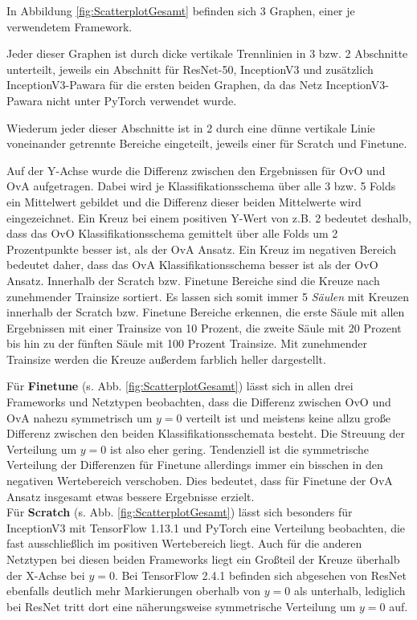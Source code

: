 In Abbildung \ref{fig:ScatterplotGesamt} befinden sich 3 Graphen, einer je verwendetem Framework.

Jeder dieser Graphen ist durch dicke vertikale Trennlinien in 3 bzw. 2 Abschnitte unterteilt, jeweils ein Abschnitt für ResNet-50, InceptionV3 und zusätzlich InceptionV3-Pawara für die ersten beiden Graphen, da das Netz InceptionV3-Pawara nicht unter PyTorch \cite{pytorch} verwendet wurde.

Wiederum jeder dieser Abschnitte ist in 2 durch eine dünne vertikale Linie voneinander getrennte Bereiche eingeteilt, jeweils einer für Scratch und Finetune.

Auf der Y-Achse wurde die Differenz zwischen den Ergebnissen für OvO und OvA aufgetragen. Dabei wird je Klassifikationsschema über alle 3 bzw. 5 Folds ein Mittelwert gebildet und die Differenz dieser beiden Mittelwerte wird eingezeichnet. Ein Kreuz bei einem positiven Y-Wert von z.B. 2 bedeutet deshalb, dass das OvO Klassifikationsschema gemittelt über alle Folds um 2 Prozentpunkte besser ist, als der OvA Ansatz. Ein Kreuz im negativen Bereich bedeutet daher, dass das OvA Klassifikationsschema besser ist als der OvO Ansatz.
Innerhalb der Scratch bzw. Finetune Bereiche sind die Kreuze nach zunehmender Trainsize sortiert. Es lassen sich somit immer 5 \textit{Säulen} mit Kreuzen innerhalb der Scratch bzw. Finetune Bereiche erkennen, die erste Säule mit allen Ergebnissen mit einer Trainsize von 10 Prozent, die zweite Säule mit 20 Prozent bis hin zu der fünften Säule mit 100 Prozent Trainsize. Mit zunehmender Trainsize werden die Kreuze außerdem farblich heller dargestellt.


Für \textbf{Finetune} (s. Abb. \ref{fig:ScatterplotGesamt}) lässt sich in allen drei Frameworks und Netztypen beobachten, dass die Differenz zwischen OvO und OvA nahezu symmetrisch um $y=0$ verteilt ist und meistens keine allzu große Differenz zwischen den beiden Klassifikationsschemata besteht. Die Streuung der Verteilung um $y=0$ ist also eher gering.
Tendenziell ist die symmetrische Verteilung der Differenzen für Finetune allerdings immer ein bisschen in den negativen Wertebereich verschoben. Dies bedeutet, dass für Finetune der OvA Ansatz insgesamt etwas bessere Ergebnisse erzielt.\\

Für \textbf{Scratch} (s. Abb. \ref{fig:ScatterplotGesamt}) lässt sich besonders für InceptionV3 mit TensorFlow \cite{tensorflow} 1.13.1 und PyTorch eine Verteilung beobachten, die fast ausschließlich im positiven Wertebereich liegt. Auch für die anderen Netztypen bei diesen beiden Frameworks liegt ein Großteil der Kreuze überhalb der X-Achse bei $y=0$. Bei TensorFlow \cite{tensorflow} 2.4.1 befinden sich abgesehen von ResNet ebenfalls deutlich mehr Markierungen oberhalb von $y=0$ als unterhalb, lediglich bei ResNet tritt dort eine näherungsweise symmetrische Verteilung um $y=0$ auf.\\

